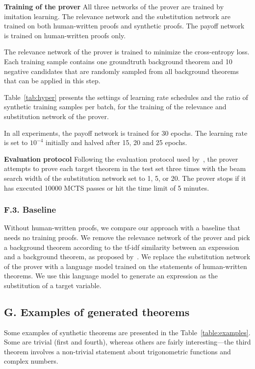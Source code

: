\documentclass{article}
\begin{document}
\noindent\textbf{Training of the prover}
All three networks of the prover are trained by imitation  learning. 
The relevance network and the substitution network
are trained on both human-written proofs and  synthetic proofs.
The payoff network is trained on human-written proofs only.

The relevance network of the prover 
is trained to minimize the cross-entropy loss.
Each training sample contains 
one groundtruth background theorem
and 10 negative candidates that are randomly sampled
from all background theorems that can be applied in this step.

Table~\ref{tab:hyper} presents the settings of learning rate schedules 
and
the ratio of synthetic training samples per batch, 
for the training of the relevance and substitution network
of the prover.

In all experiments, the payoff network is trained for 30 epochs. 
The learning rate is set to $10^{-4}$ initially and halved
after 15, 20 and 25 epochs.

\noindent\textbf{Evaluation protocol}
Following the evaluation protocol used by~\citet{whalen2016holophrasm},
the prover attempts to prove each target theorem in the test set
three times with the beam search width of the substitution network set to 1, 5, or 20.
The prover stops if it has executed 10000 MCTS passes
or hit the time limit of 5 minutes.

\subsubsection*{F.3. Baseline}

Without human-written proofs,
we compare our approach with a baseline that needs no training proofs.
We remove the relevance network of the prover 
and pick a background theorem according to 
the tf-idf similarity between an expression and a background theorem, as proposed by~\citet{bansal2019learning}.
We replace the substitution network of the prover 
with a language model trained on the statements of human-written theorems.
We use this language model to generate an expression as the substitution of a target variable.

\subsection*{G. Examples of generated theorems}
Some examples of synthetic theorems are presented in the Table~\ref{table:examples}. Some are trivial (first and fourth), whereas others are fairly interesting---the third theorem involves a non-trivial statement about trigonometric functions and complex numbers. 
\end{document}
